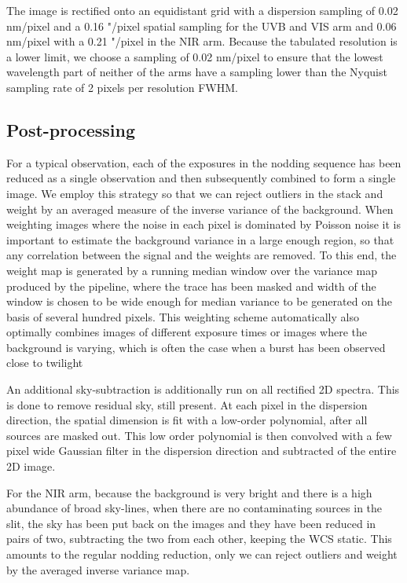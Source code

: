 \documentclass{aa}    %
\begin{document}
The image is rectified onto an equidistant grid with a dispersion sampling of
0.02 nm/pixel and a 0.16 "/pixel spatial sampling for the UVB and VIS arm and
0.06 nm/pixel with a 0.21 "/pixel in the NIR arm.  Because the tabulated
resolution is a lower limit, we choose a sampling of 0.02 nm/pixel to ensure
that the lowest wavelength part of neither of the arms have a sampling lower
than the Nyquist sampling rate of 2 pixels per resolution FWHM.

\subsection{Post-processing} \label{postproc}

For a typical observation, each of the exposures in the nodding sequence has
been reduced as a single observation and then subsequently combined to form a
single image. We employ this strategy so that we can reject outliers in the
stack and weight by an averaged measure of the inverse variance of the
background. When weighting images where the noise in each pixel is dominated by
Poisson noise it is important to estimate the background variance in a large
enough region, so that any correlation between the signal and the weights are
removed. To this end, the weight map is generated by a running median window
over the variance map produced by the pipeline, where the trace has been masked
and width of the window is chosen to be wide enough for median variance to be
generated on the basis of several hundred pixels. This weighting scheme
automatically also optimally combines images of different exposure times or
images where the background is varying, which is often the case when a burst has
been observed close to twilight

An additional sky-subtraction is additionally run on all rectified 2D spectra.
This is done to remove residual sky, still present. At each pixel in the
dispersion direction, the spatial dimension is fit with a low-order polynomial,
after all sources are masked out. This low order polynomial is then convolved
with a few pixel wide Gaussian filter in the dispersion direction and subtracted
of the entire 2D image.

For the NIR arm, because the background is very bright and there is a high
abundance of broad sky-lines, when there are no contaminating sources in the
slit, the sky has been put back on the images and they have been reduced in
pairs of two, subtracting the two from each other, keeping the WCS static. This
amounts to the regular nodding reduction, only we can reject outliers and weight
by the averaged inverse variance map.
\end{document}

